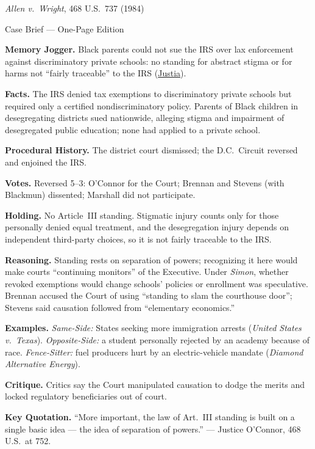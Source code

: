 \documentclass[12pt]{article}
\begin{document}
\begin{center}
{\Large \textit{Allen v.\ Wright}, 468 U.S.\ 737 (1984)\par}
\vspace{0.3em}
{\normalsize Case Brief --- One-Page Edition\par}
\end{center}

\textbf{Memory Jogger.} Black parents could not sue the IRS over lax enforcement against discriminatory private schools: no standing for abstract stigma or for harms not ``fairly traceable'' to the IRS (\href{https://supreme.justia.com/cases/federal/us/468/737/}{Justia}).

\textbf{Facts.} The IRS denied tax exemptions to discriminatory private schools but required only a certified nondiscriminatory policy. Parents of Black children in desegregating districts sued nationwide, alleging stigma and impairment of desegregated public education; none had applied to a private school.

\textbf{Procedural History.} The district court dismissed; the D.C.\ Circuit reversed and enjoined the IRS.

\textbf{Votes.} Reversed 5--3: O'Connor for the Court; Brennan and Stevens (with Blackmun) dissented; Marshall did not participate.

\textbf{Holding.} No Article~III standing. Stigmatic injury counts only for those personally denied equal treatment, and the desegregation injury depends on independent third-party choices, so it is not fairly traceable to the IRS.

\textbf{Reasoning.} Standing rests on separation of powers; recognizing it here would make courts ``continuing monitors'' of the Executive. Under \textit{Simon}, whether revoked exemptions would change schools' policies or enrollment was speculative. Brennan accused the Court of using ``standing to slam the courthouse door''; Stevens said causation followed from ``elementary economics.''

\textbf{Examples.} \emph{Same-Side:} States seeking more immigration arrests (\textit{United States v.\ Texas}). \emph{Opposite-Side:} a student personally rejected by an academy because of race. \emph{Fence-Sitter:} fuel producers hurt by an electric-vehicle mandate (\textit{Diamond Alternative Energy}).

\textbf{Critique.} Critics say the Court manipulated causation to dodge the merits and locked regulatory beneficiaries out of court.

\textbf{Key Quotation.} ``More important, the law of Art.\ III standing is built on a single basic idea --- the idea of separation of powers.'' --- Justice O'Connor, 468 U.S.\ at 752.
\end{document}
